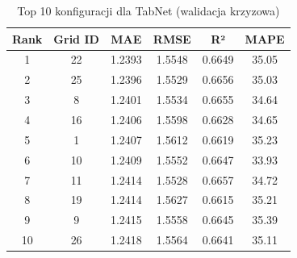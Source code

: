 \begin{table}[h]
\centering
\caption{Top 10 konfiguracji dla TabNet (walidacja krzyzowa)}
\label{tab:cv_results_tabnet}
\small
\begin{tabular}{cccccc}
\toprule
Rank & Grid ID & MAE & RMSE & R² & MAPE \\
\midrule
1 & 22 & 1.2393 & 1.5548 & 0.6649 & 35.05 \\
2 & 25 & 1.2396 & 1.5529 & 0.6656 & 35.03 \\
3 & 8 & 1.2401 & 1.5534 & 0.6655 & 34.64 \\
4 & 16 & 1.2406 & 1.5598 & 0.6628 & 34.65 \\
5 & 1 & 1.2407 & 1.5612 & 0.6619 & 35.23 \\
6 & 10 & 1.2409 & 1.5552 & 0.6647 & 33.93 \\
7 & 11 & 1.2414 & 1.5528 & 0.6657 & 34.72 \\
8 & 19 & 1.2414 & 1.5627 & 0.6615 & 35.21 \\
9 & 9 & 1.2415 & 1.5558 & 0.6645 & 35.39 \\
10 & 26 & 1.2418 & 1.5564 & 0.6641 & 35.11 \\
\bottomrule
\end{tabular}
\end{table}

